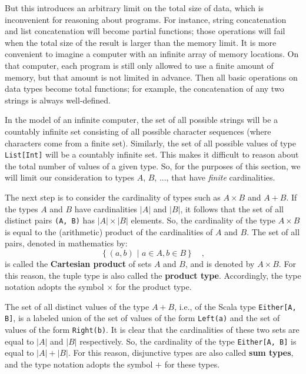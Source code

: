 But this introduces an arbitrary limit on the total size of data,
which is inconvenient for reasoning about programs. For instance,
string concatenation and list concatenation will become partial functions;
those operations will fail when the total size of the result is larger
than the memory limit. It is more convenient to imagine a computer
with an infinite array of memory locations. On that computer, each
program is still only allowed to use a finite amount of memory, but
that amount is not limited in advance. Then all basic operations on
data types become total functions; for example, the concatenation
of any two strings is always well-defined.

In the model of an infinite computer, the set of all possible strings
will be a countably infinite set consisting of all possible character
sequences (where characters come from a finite set). Similarly, the
set of all possible values of type \lstinline!List[Int]! will be
a countably infinite set. This makes it difficult to reason about
the total number of values of a given type. So, for the purposes of
this section, we will limit our consideration to types $A$, $B$,
..., that have  \emph{finite} cardinalities.

The next step is to consider the cardinality of types such as $A\times B$
and $A+B$. If the types $A$ and $B$ have cardinalities $\left|A\right|$
and $\left|B\right|$, it follows that the set of all distinct pairs
\lstinline!(A, B)! has $\left|A\right|\times\left|B\right|$ elements.
So, the cardinality of the type $A\times B$ is equal to the (arithmetic)
product of the cardinalities of $A$ and $B$. The set of all pairs,
denoted in mathematics by:
\[
\left\{ (a,b)\,\,|\,\,a\in A,b\in B\right\} \quad,
\]
is called the \textbf{Cartesian product}
of sets $A$ and $B$, and is denoted by $A\times B$. For this reason,
the tuple type is also called the \textbf{product
type}. Accordingly, the type notation adopts the symbol $\times$
for the product type.

The set of all distinct values of the type $A+B$, i.e., of the Scala
type \lstinline!Either[A, B]!, is a labeled
union of the set of values of the form \lstinline!Left(a)! and the
set of values of the form \lstinline!Right(b)!. It is clear that
the cardinalities of these two sets are equal to $\left|A\right|$
and $\left|B\right|$ respectively. So, the cardinality of the type
\lstinline!Either[A, B]! is equal to $\left|A\right|+\left|B\right|$.
For this reason, disjunctive types are also called \textbf{sum
types}, and the type notation adopts the symbol $+$ for these types.

